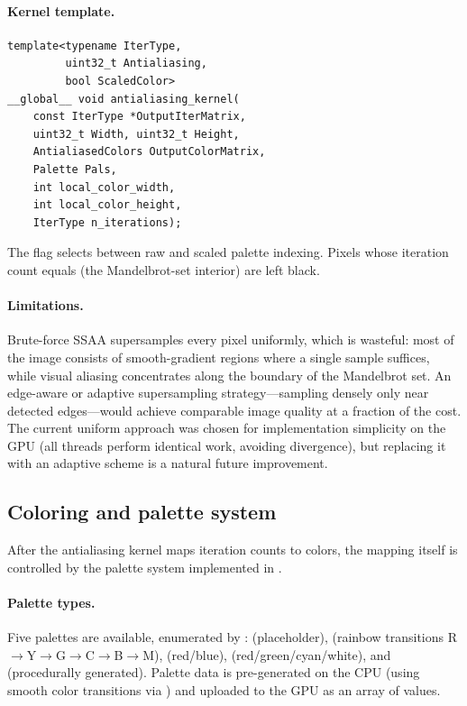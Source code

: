 \paragraph{Kernel template.}
\begin{lstlisting}
template<typename IterType,
         uint32_t Antialiasing,
         bool ScaledColor>
__global__ void antialiasing_kernel(
    const IterType *OutputIterMatrix,
    uint32_t Width, uint32_t Height,
    AntialiasedColors OutputColorMatrix,
    Palette Pals,
    int local_color_width,
    int local_color_height,
    IterType n_iterations);
\end{lstlisting}
The  flag selects between raw and scaled palette
indexing.  Pixels whose iteration count equals 
(the Mandelbrot-set interior) are left black.

\paragraph{Limitations.}
Brute-force SSAA supersamples every pixel uniformly, which is
wasteful: most of the image consists of smooth-gradient regions where
a single sample suffices, while visual aliasing concentrates along the
boundary of the Mandelbrot set.  An edge-aware or adaptive
supersampling strategy---sampling densely only near detected
edges---would achieve comparable image quality at a fraction of the
cost.  The current uniform approach was chosen for implementation
simplicity on the GPU (all threads perform identical work, avoiding
divergence), but replacing it with an adaptive scheme is a natural
future improvement.

\subsection{Coloring and palette system}
\label{subsec:coloring}

After the antialiasing kernel maps iteration counts to colors, the
mapping itself is controlled by the palette system implemented in
.

\paragraph{Palette types.}
Five palettes are available, enumerated by
:
 (placeholder),
 (rainbow transitions R$\to$Y$\to$G$\to$C$\to$B$\to$M),
 (red/blue),
 (red/green/cyan/white), and
 (procedurally generated).
Palette data is pre-generated on the CPU (using smooth color
transitions via ) and uploaded to the GPU as an
array of  values.

